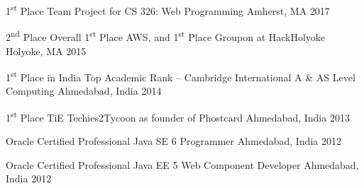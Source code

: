 



\begin{cvhonors}

  \cvhonor
    {1\textsuperscript{st} Place} %
    {Team Project for CS 326: Web Programming} %
    {Amherst, MA} %
    {2017} %

  \cvhonor
    {2\textsuperscript{nd} Place Overall} %
    {1\textsuperscript{st} Place AWS, and 1\textsuperscript{st} Place Groupon at HackHolyoke} %
    {Holyoke, MA} %
    {2015} %

  \cvhonor
    {1\textsuperscript{st} Place in India} %
    {Top Academic Rank – Cambridge International A \& AS Level Computing} %
    {Ahmedabad, India} %
    {2014} %

  \cvhonor
    {1\textsuperscript{st} Place} %
    {TiE Techies2Tycoon as founder of Phostcard} %
    {Ahmedabad, India} %
    {2013} %

\end{cvhonors}




\begin{cvhonors}

  \cvhonor
    {Oracle Certified Professional} %
    {Java SE 6 Programmer} %
    {Ahmedabad, India} %
    {2012} %

  \cvhonor
    {Oracle Certified Professional} %
    {Java EE 5 Web Component Developer} %
    {Ahmedabad, India} %
    {2012} %

\end{cvhonors}
